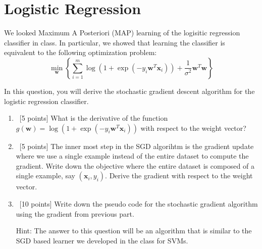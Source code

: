 \section{Logistic Regression}\label{sec:q1}

We looked Maximum A Posteriori (MAP) learning of the logisitic
regression classifier in class.  In particular, we showed that
learning the classifier is equivalent to the following optimization
problem:
\begin{equation*}
    \min_{\mathbf{w}}\left\{\sum\limits_{i=1}^m \log(1+\exp(-y_i \mathbf{w}^{T}\mathbf{x}_i))+\frac{1}{\sigma^2}\mathbf{w}^T \mathbf{w}\right\}
\end{equation*}

In this question, you will derive the stochastic gradient descent
algorithm for the logistic regression classifier. 

\begin{enumerate}
\item~[5 points] What is the derivative of the function
  $g(\mathbf{w})=\log(1+\exp(-y_i \mathbf{w}^T\mathbf{x}_i))$ with
  respect to the weight vector?

\item~[5 points] The inner most step in the SGD algorihtm is the
  gradient update where we use a single example instead of the entire
  dataset to compute the gradient.  Write down the objective where the
  entire dataset is composed of a single example, say
  $(\mathbf{x}_i, y_i)$.  Derive the gradient with respect to the
  weight vector.

\item~[10 points] Write down the pseudo code for the stochastic
  gradient algorithm using the gradient from previous part.

  Hint: The answer to this question will be an algorithm that is
  similar to the SGD based learner we developed in the class for SVMs.

\end{enumerate}

